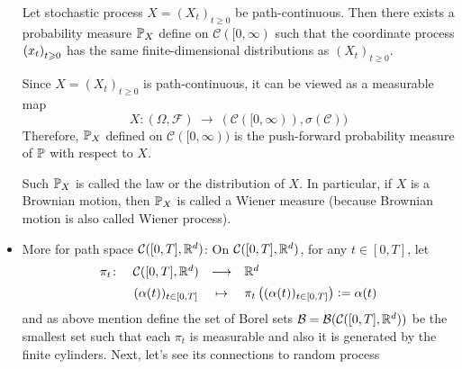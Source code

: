 \documentclass[a4paper,12pt]{article}
\begin{document}
\begin{itemize}
  \begin{prop}
    Let stochastic process $X=(X_t)_{t\geqslant 0}$ be path-continuous. Then there exists a probability measure $\mathbb{P}_X$ define on $\mathcal{C}([0,\infty)$ such that the coordinate process $\left(x_t\right)_{t\geqslant 0}$ has the same finite-dimensional distributions as $(X_t)_{t \geqslant 0}.$
  \end{prop}
  \begin{rmk}
    Since $X=(X_t)_{t\geqslant 0}$ is path-continuous, it can be viewed as a measurable map
    \begin{equation*}
      X \colon (\Omega,\mathcal{F}) ~\longrightarrow~(\mathcal{C}([0,\infty)),\sigma(\mathcal{C}))
    \end{equation*}
    Therefore, $\mathbb{P}_X$ defined on $\mathcal{C}([0,\infty))$ is the push-forward probability measure of $\mathbb{P}$ with respect to $X$.
  \end{rmk}
  Such $\mathbb{P}_X$ is called the law or the distribution of $X$. In particular, if $X$ is a Brownian motion, then $\mathbb{P}_X$ is called a Wiener measure (because Brownian motion is also called Wiener process).

  \item More for path space $\mathcal{C}([0,T],\mathbb{R}^d)$: On $\mathcal{C}([0,T],\mathbb{R}^d)$, for any $t \in [0,T]$, let
  \begin{equation*}
    \begin{array}{cccl}
    \vspace{0.5em}
      \pi_t \colon &\mathcal{C}([0,T],\R^d)& \longrightarrow & \R^d\\
      ~&(\alpha(t))_{t \in [0,T]} &\mapsto & \pi_t\bc{(\alpha(t))_{t \in [0,T]}} \defeq \alpha(t)
    \end{array}
  \end{equation*}
  and as above mention define the set of Borel sets $\mathcal{B} = \mathcal{B}(\mathcal{C}([0,T],\mathbb{R}^d))$ be the smallest set such that each $\pi_t$ is measurable and also it is generated by the finite cylinders. Next, let's see its connections to random process


\end{itemize}
\end{document}
